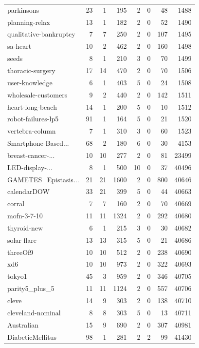 \begin{tabular}{@{\hskip 0mm}l@{\hskip 0mm}rrrrrrr}
 parkinsons & 23 & 1 & 195 & 2 & 0 & 48 & 1488 \\
 planning-relax & 13 & 1 & 182 & 2 & 0 & 52 & 1490 \\
 qualitative-bankruptcy & 7 & 7 & 250 & 2 & 0 & 107 & 1495 \\
 sa-heart & 10 & 2 & 462 & 2 & 0 & 160 & 1498 \\
 seeds & 8 & 1 & 210 & 3 & 0 & 70 & 1499 \\
 thoracic-surgery & 17 & 14 & 470 & 2 & 0 & 70 & 1506 \\
 user-knowledge & 6 & 1 & 403 & 5 & 0 & 24 & 1508 \\
 wholesale-customers & 9 & 2 & 440 & 2 & 0 & 142 & 1511 \\
 heart-long-beach & 14 & 1 & 200 & 5 & 0 & 10 & 1512 \\
 robot-failures-lp5 & 91 & 1 & 164 & 5 & 0 & 21 & 1520 \\
 vertebra-column & 7 & 1 & 310 & 3 & 0 & 60 & 1523 \\
Smartphone-Based... & 68 & 2 & 180 & 6 & 0 & 30 & 4153 \\
 breast-cancer-... & 10 & 10 & 277 & 2 & 0 & 81 & 23499 \\
 LED-display-... & 8 & 1 & 500 & 10 & 0 & 37 & 40496 \\
 GAMETES\_Epistasis... & 21 & 21 & 1600 & 2 & 0 & 800 & 40646 \\
 calendarDOW & 33 & 21 & 399 & 5 & 0 & 44 & 40663 \\
 corral & 7 & 7 & 160 & 2 & 0 & 70 & 40669 \\
 mofn-3-7-10 & 11 & 11 & 1324 & 2 & 0 & 292 & 40680 \\
 thyroid-new & 6 & 1 & 215 & 3 & 0 & 30 & 40682 \\
 solar-flare & 13 & 13 & 315 & 5 & 0 & 21 & 40686 \\
 threeOf9 & 10 & 10 & 512 & 2 & 0 & 238 & 40690 \\
 xd6 & 10 & 10 & 973 & 2 & 0 & 322 & 40693 \\
 tokyo1 & 45 & 3 & 959 & 2 & 0 & 346 & 40705 \\
 parity5\_plus\_5 & 11 & 11 & 1124 & 2 & 0 & 557 & 40706 \\
 cleve & 14 & 9 & 303 & 2 & 0 & 138 & 40710 \\
 cleveland-nominal & 8 & 8 & 303 & 5 & 0 & 13 & 40711 \\
 Australian & 15 & 9 & 690 & 2 & 0 & 307 & 40981 \\
 DiabeticMellitus & 98 & 1 & 281 & 2 & 2 & 99 & 41430 \\

\end{tabular}
